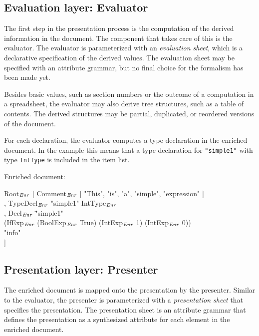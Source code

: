 \documentclass{speauth}
\begin{document}
%																
\subsection{Evaluation layer: Evaluator} \label{sect:evaluator}

The first step in the presentation process is the computation of the derived information in the document. The component that takes care of this is the evaluator. The evaluator is parameterized with an {\em evaluation sheet}, which is a declarative specification of the derived values. The evaluation sheet may be specified with an attribute grammar, but no final choice for the formalism has been made yet.

Besides basic values, such as section numbers or the outcome of a computation in a spreadsheet, the evaluator may also derive tree structures, such as a table of contents. The derived structures may be partial, duplicated, or reordered versions of the document.

 For each declaration, the evaluator computes a type declaration in the enriched document. In the example this means that a type declaration for \verb|"simple1"| with type {\tt IntType} is included in the item list.

Enriched document:
\small \ttfamily
\begin{tabbing}
Root$_{\mathit{Enr}}$ \= [ Comment$_{\mathit{Enr}}$ [ "This", "is", "a", "simple", "expression" ]\\
       \> , TypeDecl$_{\mathit{Enr}}$ "simple1" IntType$_{\mathit{Enr}}$\\
       \> , Decl$_{\mathit{Enr}}$ \= "simple1"\\
       \>                       \> (IfExp$_{\mathit{Enr}}$ (BoolExp$_{\mathit{Enr}}$ True) (IntExp$_{\mathit{Enr}}$ 1) (IntExp$_{\mathit{Enr}}$ 0)) \\
       \>                        \> "info"\\
       \> ] 
\end{tabbing}
\rmfamily \normalsize


%																
\subsection{Presentation layer: Presenter} \label{sect:presenter}

The enriched document is mapped onto the presentation by the presenter. Similar to the evaluator, the presenter is parameterized with a {\em presentation sheet} that specifies the presentation. The presentation sheet is an attribute grammar that defines the presentation as a synthesized attribute for each element in the enriched document. 
\end{document}

